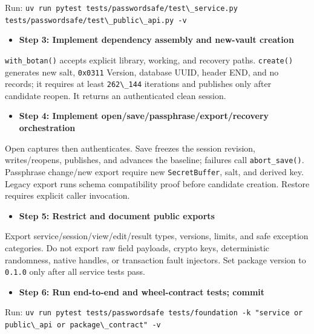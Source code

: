 \documentclass[
  letterpaper,
]{article}
\newcommand{\passthrough}[1]{#1}
\providecommand{\tightlist}{%
  \setlength{\itemsep}{0pt}\setlength{\parskip}{0pt}}
\begin{document}
Run:
\passthrough{\lstinline!uv run pytest tests/passwordsafe/test\_service.py tests/passwordsafe/test\_public\_api.py -v!}

\begin{itemize}
\tightlist
\item[$\square$]
  \textbf{Step 3: Implement dependency assembly and new-vault creation}
\end{itemize}

\nolinkurl{with_botan()} accepts explicit library, working, and recovery paths. \passthrough{\lstinline!create()!}
generates new salt, \passthrough{\lstinline!0x0311!} Version, database UUID, header END, and no records; it requires at
least \passthrough{\lstinline!262\_144!} iterations and publishes only after candidate reopen. It returns an
authenticated clean session.

\begin{itemize}
\tightlist
\item[$\square$]
  \textbf{Step 4: Implement open/save/passphrase/export/recovery orchestration}
\end{itemize}

Open captures then authenticates. Save freezes the session revision, writes/reopens, publishes, and advances the
baseline; failures call \nolinkurl{abort_save()}. Passphrase change/new export require new \nolinkurl{SecretBuffer},
salt, and derived key. Legacy export runs schema compatibility proof before candidate creation. Restore requires
explicit caller invocation.

\begin{itemize}
\tightlist
\item[$\square$]
  \textbf{Step 5: Restrict and document public exports}
\end{itemize}

Export service/session/view/edit/result types, versions, limits, and safe exception categories. Do not export raw field
payloads, crypto keys, deterministic randomness, native handles, or transaction fault injectors. Set package version to
\passthrough{\lstinline!0.1.0!} only after all service tests pass.

\begin{itemize}
\tightlist
\item[$\square$]
  \textbf{Step 6: Run end-to-end and wheel-contract tests; commit}
\end{itemize}

Run:
\passthrough{\lstinline!uv run pytest tests/passwordsafe tests/foundation -k "service or public\_api or package\_contract" -v!}
\end{document}
